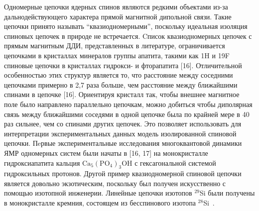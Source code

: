 Одномерные цепочки ядерных спинов являются редкими объектами из-за дальнодействующего характера прямой магнитной дипольной связи.
Такие цепочки принято называть ``квазиодномерными'', поскольку идеальная изоляция спиновых цепочек в природе не встречается.
Cписок квазиодномерных цепочек с прямым магнитным ДДИ,
представленных в литературе,
ограничивается цепочками в кристаллах минералов группы апатита,
такими как 1H и 19F спиновые цепочки в кристаллах гидрокси- и фторапатита [16].
Отличительной особенностью этих структур является то, что расстояние между соседними цепочками примерно в 2,7 раза больше, чем расстояние между ближайшими спинами в цепочке [16]. Ориентируя кристалл так,
чтобы внешнее магнитное поле было направлено параллельно цепочкам,
можно добиться чтобы диполярная связь между ближайшими соседями в одной цепочке была по крайней мере в 40 раз сильнее,
чем со спинами других цепочек.
%
Это позволяет использовать для интерпретации экспериментальных данных модель изолированной спиновой цепочки.
Пeрвые экспериментальные исследования многоквантовой динамики ЯМР одномерных систем были начаты в [16, 17] на монокристалле гидроксиапатита кальция $\mathrm{Ca}_5(\mathrm{PO}_4)_3\mathrm{OH}$ с гексагональной системой гидроксильных протонов.
Другой пример квазиодномерной спиновой цепочки является довольно экзотическим,
поскольку был получен искусственно с помощью изотопной инженерии.
Линейные цепочки изотопов $^{29}$Si были получены в монокристалле кремния, состоящем из бесспинового изотопа $^28$Si~\cite{Itoh2005}.

